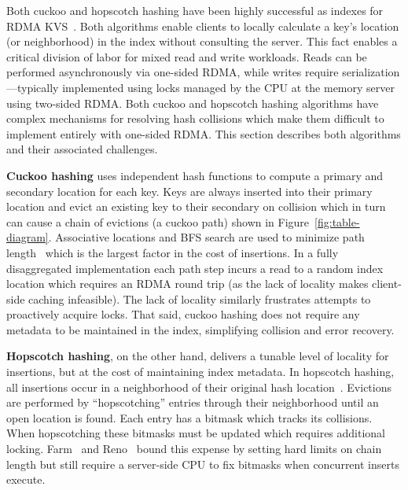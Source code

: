 
Both cuckoo and hopscotch hashing have been highly successful as
indexes for RDMA
KVS~\cite{farm,memc3,reno,cuckoo-improvements,pilaf}. Both algorithms
enable clients to locally calculate a key's location (or neighborhood)
in the index without consulting the server. This fact enables a
critical division of labor for mixed read and write workloads. Reads
can be performed asynchronously via one-sided RDMA, while writes
require serialization---typically implemented using locks managed by
the CPU at the memory server using two-sided RDMA.  Both cuckoo and hopscotch hashing algorithms
have complex mechanisms for resolving hash collisions which make them
difficult to implement entirely with one-sided RDMA. This section
describes both algorithms and their associated challenges.

\textbf{Cuckoo hashing} uses independent hash functions to compute a primary and secondary location
for each key. Keys are always inserted into their primary location and evict an existing key to
their secondary on collision which in turn can cause a chain of evictions (a cuckoo path) shown in
Figure~\ref{fig:table-diagram}. Associative locations and BFS search are used to minimize path
length~\cite{memc3,cuckoo-improvements} which is the largest factor in the cost of insertions. 
In a fully disaggregated implementation each path step incurs a read to a random index location
which requires an RDMA round trip (as the lack of locality makes client-side caching infeasible).  The lack of locality similarly frustrates attempts to proactively acquire locks.
That said, cuckoo hashing
does not require any metadata to be maintained in the index, simplifying collision and error recovery.

\textbf{Hopscotch hashing}, on the other hand, delivers a tunable
level of locality for insertions, but at the cost of maintaining index
metadata.  In hopscotch hashing, all insertions occur in a
neighborhood of their original hash
location~\cite{farm,hopscotch}. Evictions are performed by
``hopscotching'' entries through their neighborhood until an open
location is found.  Each entry has a bitmask which tracks its
collisions. When hopscotching these bitmasks must be updated which
requires additional locking.  Farm~\cite{farm} and Reno~\cite{reno}
bound this expense by setting hard limits on chain length but still
require a server-side CPU to fix bitmasks when concurrent inserts
execute.

